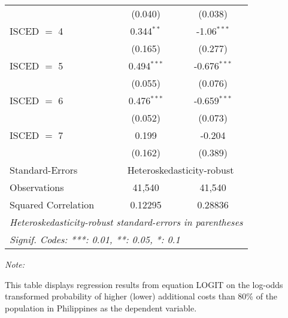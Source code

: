 \begin{table}[htbp!]
\begin{adjustbox}{width = 1\textwidth, max height = 0.95\textheight, center}
\begin{threeparttable}[b]
\begin{tabular}{lcc}
                                 & (0.040)        & (0.038)\\   
            ISCED $=$ 4          & 0.344$^{**}$   & -1.06$^{***}$\\   
                                 & (0.165)        & (0.277)\\   
            ISCED $=$ 5          & 0.494$^{***}$  & -0.676$^{***}$\\   
                                 & (0.055)        & (0.076)\\   
            ISCED $=$ 6          & 0.476$^{***}$  & -0.659$^{***}$\\   
                                 & (0.052)        & (0.073)\\   
            ISCED $=$ 7          & 0.199          & -0.204\\   
                                 & (0.162)        & (0.389)\\   
            \midrule 
            Standard-Errors & \multicolumn{2}{c}{Heteroskedasticity-robust} \\ 
            Observations         & 41,540         & 41,540\\  
            Squared Correlation  & 0.12295        & 0.28836\\  
            \midrule \midrule
            \multicolumn{3}{l}{\emph{Heteroskedasticity-robust standard-errors in parentheses}}\\
            \multicolumn{3}{l}{\emph{Signif. Codes: ***: 0.01, **: 0.05, *: 0.1}}\\
         \end{tabular}
         
         \begin{tablenotes}\item \medskip \textit{Note:}
            \item This table displays regression results from equation LOGIT on the log-odds transformed probability of higher (lower) additional costs than 80\% of the population in Philippines as the dependent variable. 
         \end{tablenotes}
      \end{threeparttable}
   \end{adjustbox}
\end{table}



